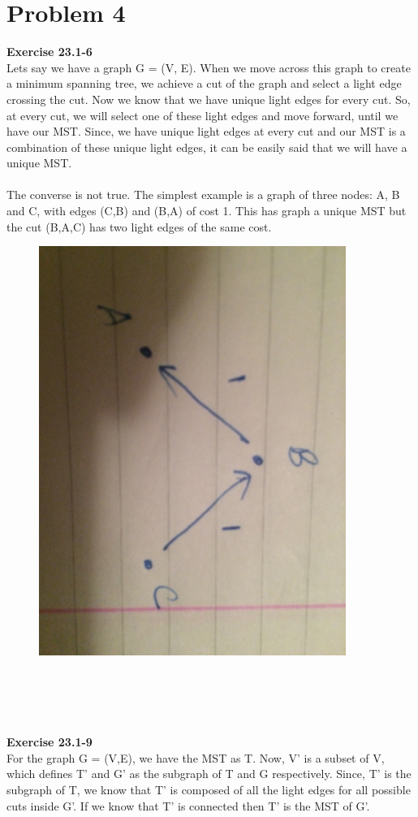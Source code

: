 \documentclass[10pt]{article}
\begin{document}
\section{Problem 4}
\textbf{Exercise 23.1-6}\\
Lets say we have a graph G = (V, E). When we move across this graph to create a minimum spanning tree, we achieve a cut of the graph and select a light edge crossing the cut. Now we know that we have unique light edges for every cut. So, at every cut, we will select one of these light edges and move forward, until we have our MST. Since, we have unique light edges at every cut and our MST is a combination of these unique light edges, it can be easily said that we will have a unique MST.\\\\
The converse is not true. The simplest example is a graph of three nodes: A, B and C, with edges (C,B) and (B,A) of cost 1. This has graph a unique MST but the cut ({B},{A,C}) has two light edges of the same cost.\\
\begin{figure}[ht!]
\includegraphics[width=100mm]{IMG_2509.JPG}
\end{figure}\\\\\\\\
\textbf{Exercise 23.1-9}\\
For the graph G = (V,E), we have the MST as T. Now, V' is a subset of V, which defines T' and G' as the subgraph of T and G respectively. Since, T' is the subgraph of T, we know that T' is composed of all the light edges for all possible cuts inside G'. If we know that T' is connected then T' is the MST of G'.
\newpage
\end{document}
